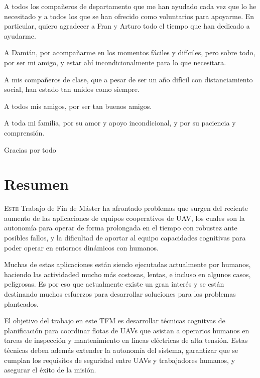 \documentclass[fontsize=11pt, English=false, Español=true, Myfinal=true, twoside, numbers=noenddot]{scrbook}
\begin{document}
A todos los compañeros de departamento que me han ayudado cada vez que lo he necesitado y a todos los que se han ofrecido como voluntarios para apoyarme. En particular, quiero agradecer a Fran y Arturo todo el tiempo que han dedicado a ayudarme. 

A Damián, por acompañarme en los momentos fáciles y difíciles, pero sobre todo, por ser mi amigo, y estar ahí incondicionalmente para lo que necesitara. 

A mis compañeros de clase, que a pesar de ser un año difícil con distanciamiento social, han estado tan unidos como siempre.

A todos mis amigos, por ser tan buenos amigos. 

A toda mi familia, por su amor y apoyo incondicional, y por su paciencia y comprensión. 

\vspace{1.3cm}
Gracias por todo
{}%
{}%

% 
\chapter*{Resumen}
\pagestyle{especial}
{}
\lettrine[lraise=-0.1, lines=2, loversize=0.2]{E}{ste} Trabajo de Fin de Máster ha afrontado problemas que surgen del reciente aumento de las aplicaciones de equipos cooperativos de \gls{UAV}, los cuales son la autonomía para operar de forma prolongada en el tiempo con robustez ante posibles fallos, y la dificultad de aportar al equipo capacidades cognitivas para poder operar en entornos dinámicos con humanos. 

Muchas de estas aplicaciones están siendo ejecutadas actualmente por humanos, haciendo las actividaded mucho más costosas, lentas, e incluso en algunos casos, peligrosas. Es por eso que actualmente existe un gran interés y se están destinando muchos esfuerzos para desarrollar soluciones para los problemas planteados.

El objetivo del trabajo en este TFM es desarrollar técnicas cognitvas de planificación para coordinar flotas de UAVs que asistan a operarios humanos en tareas de inspección y mantenimiento en líneas eléctricas de alta tensión. Estas técnicas deben además extender la autonomía del sistema, garantizar que se cumplan los requisitos de seguridad entre UAVs y trabajadores humanos, y asegurar el éxito de la misión.
\end{document}
